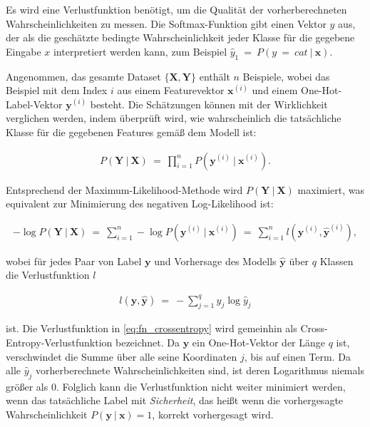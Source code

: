Es wird eine Verlustfunktion benötigt, um die Qualität der vorherberechneten Wahrscheinlichkeiten zu messen. Die Softmax-Funktion gibt einen Vektor $\hat{y}$ aus, der als die geschätzte bedingte Wahrscheinlichkeit jeder Klasse für die gegebene Eingabe $x$ interpretiert werden kann, zum Beispiel $\hat{y}_{1}\ =\ P(y\ =\ cat\ |\ \boldsymbol{x})$.

Angenommen, das gesamte Dataset $\{\boldsymbol{X}, \boldsymbol{Y}\}$ enthält $n$ Beispiele, wobei das Beispiel mit dem Index $i$ aus einem Featurevektor $\boldsymbol{x}^{(i)}$ und einem One-Hot-Label-Vektor $\boldsymbol{y}^{(i)}$ besteht. Die Schätzungen können mit der Wirklichkeit verglichen werden, indem überprüft wird, wie wahrscheinlich die tatsächliche Klasse für die gegebenen Features gemäß dem Modell ist:

\begin{align}
  P(\boldsymbol{Y}\ |\ \boldsymbol{X})\ =\ \prod_{i=1}^{n}P(\boldsymbol{y}^{(i)}\ |\ \boldsymbol{x}^{(i)}).
\end{align}

Entsprechend der Maximum-Likelihood-Methode wird $P(\boldsymbol{Y}\ |\ \boldsymbol{X})$ maximiert, was equivalent zur Minimierung des negativen Log-Likelihood ist:

\begin{align}
  -\log P(\boldsymbol{Y}\ |\ \boldsymbol{X})\ =\ \sum_{i=1}^{n}-\log P(\boldsymbol{y}^{(i)}\ |\ \boldsymbol{x}^{(i)})\ =\ \sum_{i=1}^{n}l(\boldsymbol{y}^{(i)},\boldsymbol{\hat{y}}^{(i)}),
\end{align}

wobei für jedes Paar von Label $\boldsymbol{y}$ und Vorhersage des Modells $\boldsymbol{\hat{y}}$ über $q$ Klassen die Verlustfunktion $l$

\begin{align}
  \label{eq:fn_crossentropy}
  l(\boldsymbol{y}, \boldsymbol{\hat{y}})\ =\ - \sum_{j=1}^{q}y_{j}\log\hat{y}_{j}
\end{align}

ist. Die Verlustfunktion in \eqref{eq:fn_crossentropy} wird gemeinhin als Cross-Entropy-Verlustfunktion bezeichnet. Da $\boldsymbol{y}$ ein One-Hot-Vektor der Länge $q$ ist, verschwindet die Summe über alle seine Koordinaten $j$, bis auf einen Term. Da alle $\hat{y}_j$ vorherberechnete Wahrscheinlichkeiten sind, ist deren Logarithmus niemals größer als $0$. Folglich kann die Verlustfunktion nicht weiter minimiert werden, wenn das tatsächliche Label mit \textit{Sicherheit}, das heißt wenn die vorhergesagte Wahrscheinlichkeit $P(\boldsymbol{y}\ |\ \boldsymbol{x}) = 1$, korrekt vorhergesagt wird.

